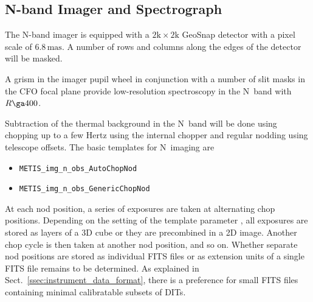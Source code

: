 \subsection{N-band Imager and Spectrograph}
\label{ssec:instrument_data_N-IMG}

The N-band imager is equipped with a $2\mathrm{k}\times 2\mathrm{k}$
GeoSnap detector with a pixel scale of $6.8\,\mathrm{mas}$. A number
of rows and columns along the edges of the detector will be masked.

A grism in the imager pupil wheel in conjunction with a number of slit
masks in the CFO focal plane provide low-resolution spectroscopy in
the N~band with $R\ga 400$.


Subtraction of the thermal background in the N~band will be done using
chopping up to a few Hertz using the internal chopper and regular nodding
using telescope offsets. The basic templates for N~imaging are
\begin{itemize}
\item \lstinline{METIS_img_n_obs_AutoChopNod}
\item \lstinline{METIS_img_n_obs_GenericChopNod}
\end{itemize}

At each nod position, a series of exposures are taken at alternating
chop positions. Depending on the setting of the template parameter
, all exposures are stored as layers of a 3D cube
or they are precombined in a 2D image. Another chop cycle is then
taken at another nod position, and so on. Whether separate nod
positions are stored as individual FITS files or as extension units of
a single FITS file remains to be determined. As explained in
Sect.~\ref{ssec:instrument_data_format}, there is a preference for
small FITS files containing minimal calibratable subsets of DITs.

